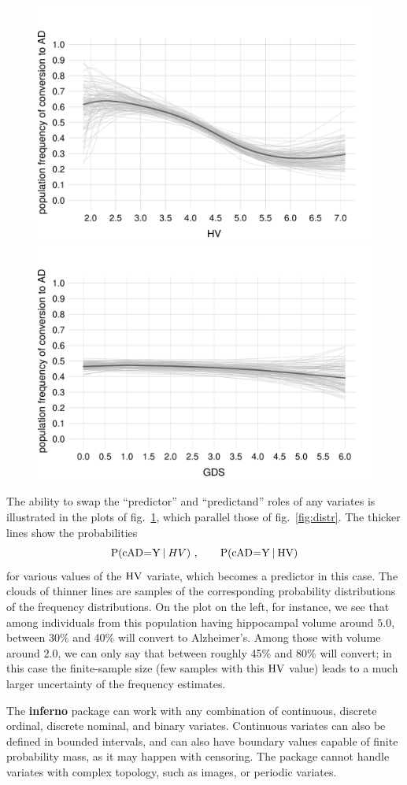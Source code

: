 \documentclass{article}
\begin{document}
\begin{figure}[t]\caption{}\label{fig:distr_inv}
  \centering
  \includegraphics[width=0.49\linewidth]{figures/prob_conversion_HV.pdf}\hfill%
  \includegraphics[width=0.49\linewidth]{figures/prob_conversion_GDS.pdf}
\end{figure}
The ability to swap the ``predictor'' and ``predictand'' roles of any variates is illustrated in the plots of fig.~\ref{fig:distr_inv}, which parallel those of fig.~\ref{fig:distr}. The thicker lines show the probabilities
\begin{equation*}
    \P( \cAD \mo \yy \| HV)\ ,\qquad
  \P( \cAD \mo \yy \| \HV)
\end{equation*}
for various values of the $\mathrm{HV}$ variate, which becomes a predictor in this case. The clouds of thinner lines are samples of the corresponding probability distributions of the frequency distributions. On the plot on the left, for instance, we see that among individuals from this population having hippocampal volume around $5.0$, between 30\% and 40\% will convert to Alzheimer's. Among those with volume around $2.0$, we can only say that between roughly 45\% and 80\% will convert; in this case the finite-sample size (few samples with this $\mathrm{HV}$ value) leads to a much larger uncertainty of the frequency estimates.

\medskip

The \textbf{inferno} package can work with any combination of continuous, discrete ordinal, discrete nominal, and binary variates. Continuous variates can also be defined in bounded intervals, and can also have boundary values capable of finite probability mass, as it may happen with censoring. The package cannot handle variates with complex topology, such as images, or periodic variates.
\end{document}
